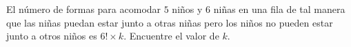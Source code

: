 El número de formas para acomodar $5$ niños y $6$ niñas en una fila de tal manera que las niñas puedan estar junto a otras niñas pero los niños no pueden estar junto a otros niños es $6! \times k$. Encuentre el valor de $k$.